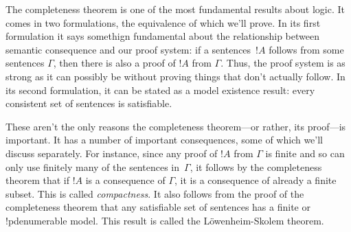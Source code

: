 \documentclass[../../include/open-logic-section]{subfiles}
\begin{document}

The completeness theorem is one of the most fundamental results about
logic.  It comes in two formulations, the equivalence of which we'll
prove. In its first formulation it says somethign fundamental about
the relationship between semantic consequence and our proof system: if
a sentences~$!A$ follows from some sentences $\Gamma$, then there is
also a proof of $!A$ from $\Gamma$.  Thus, the proof system is as
strong as it can possibly be without proving things that don't
actually follow.  In its second formulation, it can be stated as a
model existence result: every consistent set of sentences is
satisfiable.

These aren't the only reasons the completeness theorem---or rather,
its proof---is important. It has a number of important consequences,
some of which we'll discuss separately.  For instance, since any proof
of $!A$ from $\Gamma$ is finite and so can only use finitely many of
the sentences in~$\Gamma$, it follows by the completeness theorem that
if $!A$ is a consequence of $\Gamma$, it is a consequence of already a
finite subset.  This is called \emph{compactness}.  It also follows
from the proof of the completeness theorem that any satisfiable set of
sentences has a finite or !p{denumerable} model. This result is called the
L\"owenheim-Skolem theorem.
\end{document}

